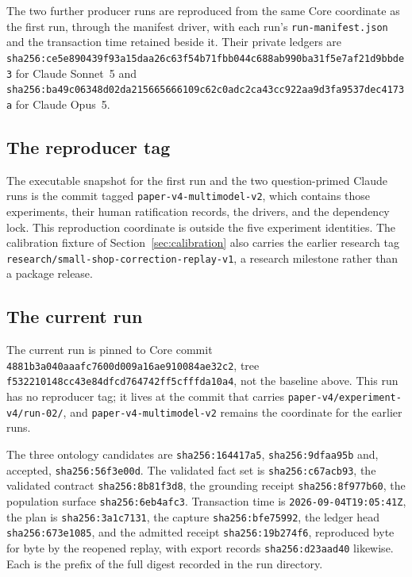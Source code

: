 \documentclass[10pt]{article}
\newcommand{\code}[1]{\texttt{#1}}
\newcommand{\digest}[1]{{\scriptsize\nolinkurl{sha256:#1}}}
\newcommand{\gitid}[1]{{\scriptsize\nolinkurl{#1}}}
\begin{document}
The two further producer runs are reproduced from the same Core coordinate as the first run, through the manifest driver, with each run's \code{run-manifest.json} and the transaction time retained beside it. Their private ledgers are \digest{ce5e890439f93a15daa26c63f54b71fbb044c688ab990ba31f5e7af21d9bbde3} for Claude Sonnet~5 and \digest{ba49c06348d02da215665666109c62c0adc2ca43cc922aa9d3fa9537dec4173a} for Claude Opus~5.

\subsection{The reproducer tag}

The executable snapshot for the first run and the two question-primed Claude runs is the commit tagged \code{paper-v4-multimodel-v2}, which contains those experiments, their human ratification records, the drivers, and the dependency lock. This reproduction coordinate is outside the five experiment identities. The calibration fixture of Section~\ref{sec:calibration} also carries the earlier research tag \code{research/small-shop-correction-replay-v1}, a research milestone rather than a package release.

\subsection{The current run}

The current run is pinned to Core commit \gitid{4881b3a040aaafc7600d009a16ae910084ae32c2}, tree \gitid{f532210148cc43e84dfcd764742ff5cfffda10a4}, not the baseline above. This run has no reproducer tag; it lives at the commit that carries \code{paper-v4/experiment-v4/run-02/}, and \code{paper-v4-multimodel-v2} remains the coordinate for the earlier runs.

The three ontology candidates are \code{sha256:164417a5}, \code{sha256:9dfaa95b} and, accepted, \code{sha256:56f3e00d}. The validated fact set is \code{sha256:c67acb93}, the validated contract \code{sha256:8b81f3d8}, the grounding receipt \code{sha256:8f977b60}, the population surface \code{sha256:6eb4afc3}. Transaction time is \code{2026-09-04T19:05:41Z}, the plan is \code{sha256:3a1c7131}, the capture \code{sha256:bfe75992}, the ledger head \code{sha256:673e1085}, and the admitted receipt \code{sha256:19b274f6}, reproduced byte for byte by the reopened replay, with export records \code{sha256:d23aad40} likewise. Each is the prefix of the full digest recorded in the run directory.
\end{document}
